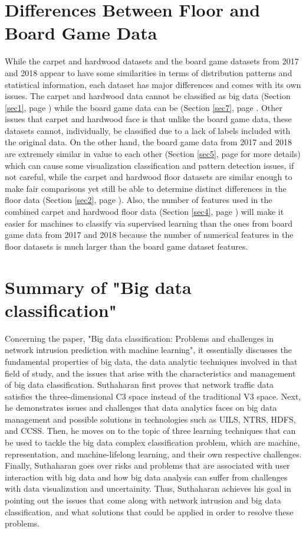 \documentclass[a4paper,12pt]{IEEEtran}
\begin{document}
\section{Differences Between Floor and Board Game Data}
While the carpet and hardwood datasets and the board game datasets from 2017 and 2018 appear to have some similarities in terms of distribution patterns and statistical information, each dataset has major differences and comes with its own issues. The carpet and hardwood data cannot be classified as big data (Section \ref{sec1}, page \pageref{sec1}) while the board game data can be (Section \ref{sec7}, page \pageref{sec7}. Other issues that carpet and hardwood face is that unlike the board game data, these datasets cannot, individually, be classified due to a lack of labels included with the original data. On the other hand, the board game data from 2017 and 2018 are extremely similar in value to each other (Section \ref{sec5}, page \pageref{sec5} for more details) which can cause some visualization classification and pattern detection issues, if not careful, while the carpet and hardwood floor datasets are similar enough to make fair comparisons yet still be able to determine distinct differences in the floor data (Section \ref{sec2}, page \pageref{sec2}). Also, the number of features used in the combined carpet and hardwood floor data (Section \ref{sec4}, page \pageref{sec4}) will make it easier for machines to classify via supervised learning than the ones from board game data from 2017 and 2018 because the number of numerical features in the floor datasets is much larger than the board game dataset features.

\section{Summary of "Big data classification"}
Concerning the paper, "Big data classification: Problems and challenges in network intrusion prediction with machine learning"\nocite{cite1}, it essentially discusses the fundamental properties of big data, the data analytic techniques involved in that field of study, and the issues that arise with the characteristics and management of big data classification. Suthaharan first proves that network traffic data satisfies the three-dimensional C3 space instead of the traditional V3 space. Next, he demonstrates issues and challenges that data analytics faces on big data management and possible solutions in technologies such as UILS, NTRS, HDFS, and CCSS. Then, he moves on to the topic of three learning techniques that can be used to tackle the big data complex classification problem, which are machine, representation, and machine-lifelong learning, and their own respective challenges. Finally, Suthaharan goes over risks and problems that are associated with user interaction with big data and how big data analysis can suffer from challenges with data visualization and uncertainity. Thus, Suthaharan achieves his goal in pointing out the issues that come along with network intrusion and big data classification, and what solutions that could be applied in order to resolve these problems.
\label{sec8}
\end{document}
